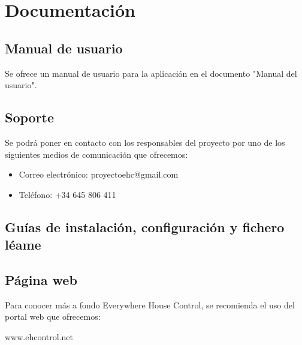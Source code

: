 \chapter{Documentación}

\section{Manual de usuario}
Se ofrece un manual de usuario para la aplicación en el documento "Manual del usuario".

\section{Soporte}
Se podrá poner en contacto con los responsables del proyecto por uno de los siguientes medios de comunicación que ofrecemos:
\begin{itemize}
\item Correo electrónico: proyectoehc@gmail.com
\item Teléfono: +34 645 806 411
\end{itemize}

\section{Guías de instalación, configuración y fichero léame}

\section{Página web}
Para conocer más a fondo Everywhere House Control, se recomienda el uso del portal web que ofrecemos:
\begin{center}
www.ehcontrol.net
\end{center}
